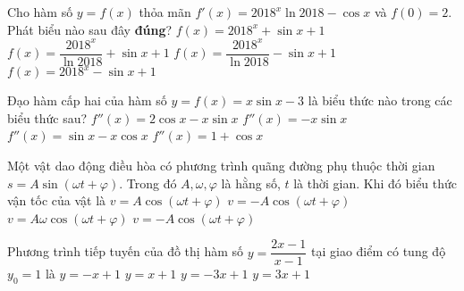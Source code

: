 \begin{ex}%
Cho hàm số $ y=f(x) $ thỏa mãn $ f'(x)=2018^x \ln 2018 -\cos x $ và $ f(0)=2 $. Phát biểu nào sau đây \textbf{đúng}?
	\choice
	{$ f(x)=2018^x+\sin x+1$}
	{$ f(x)=\dfrac{2018^x}{\ln 2018}+\sin x+1$}
	{$ f(x)=\dfrac{2018^x}{\ln 2018}-\sin x+1$}
	{\True $ f(x)=2018^x-\sin x+1$}	
\end{ex}
\begin{ex}%
 Đạo hàm cấp hai của hàm số $ y=f(x) =x \sin x-3$ là biểu thức nào trong các biểu thức sau?
	\choice
	{\True $ f''(x)=2\cos x-x \sin x $}
	{$ f''(x)=-x \sin x$}
	{$ f''(x)=\sin x-x \cos x$}
	{$ f''(x)=1+\cos x$}	
\end{ex}
\begin{ex}%
Một vật dao động điều hòa có phương trình quãng đường phụ thuộc thời gian $ s=A\sin \left(\omega t+\varphi
	\right) $. Trong đó $ A,\omega,\varphi $ là hằng số, $ t $ là thời gian. Khi đó biểu thức vận tốc của vật là
	\choice
	{$  v=A\cos \left(\omega t+\varphi\right)$}
	{$  v=- A\cos \left(\omega t+\varphi\right)$}
	{\True $  v=A\omega \cos \left(\omega t+\varphi\right)$}
	{$  v=- A\cos \left(\omega t+\varphi\right)$}
\end{ex} 
\begin{ex}%
Phương trình tiếp tuyến của đồ thị hàm số $ y=\dfrac{2x-1}{x-1} $ tại giao điểm có tung độ $ y_0=1 $ là
	\choice
	{\True $ y=-x+1 $}
	{$ y=x+1 $}
	{$ y=-3x+1 $}
	{$ y=3x+1 $}
\end{ex}
